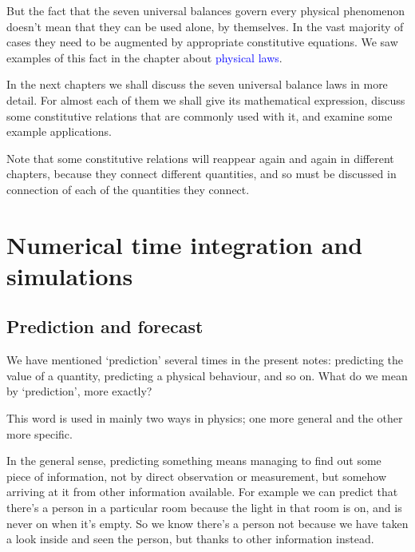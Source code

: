 \documentclass[a4paper,12pt,%
onecolumn,oneside,titlepage,%
british%
]{memoir}
\renewcommand*{\|}[1][]{\nonscript\:#1\vert\nonscript\:\mathopen{}}
\newcommand*{\sect}{\S}%
\renewcommand*{\autoref}[2]{\sidepar{\vspace{-1ex}\footnotesize{\color{blue}\faIcon{%
reply%
}\enspace\sect\,\ref{#1} page\,\pageref{#1}}}\textcolor{blue}{#2}}
\begin{document}
\smallskip


But the fact that the seven universal balances govern every physical phenomenon doesn't mean that they can be used alone, by themselves. In the vast majority of cases they need to be augmented by appropriate constitutive equations. We saw examples of this fact in the chapter about \autoref{cha:laws}{physical laws}.


\bigskip

In the next chapters we shall discuss the seven universal balance laws in more detail. For almost each of them we shall give its mathematical expression, discuss some constitutive relations that are commonly used with it, and examine some example applications.

Note that some constitutive relations will reappear again and again in different chapters, because they connect different quantities, and so must be discussed in connection of each of the quantities they connect.



\section{Numerical time integration and simulations}
\label{sec:numeric_simulation}


\subsection{Prediction and forecast}
\label{sec:forecast}

We have mentioned \enquote*{prediction} several times in the present notes: predicting the value of a quantity, predicting a physical behaviour, and so on. What do we mean by \enquote*{prediction}, more exactly?

This word is used in mainly two ways in physics; one more general and the other more specific.

In the general sense, predicting something means managing to find out some piece of information, not by direct observation or measurement, but somehow arriving at it from other information available. For example we can predict that there's a person in a particular room because the light in that room is on, and is never on when it's empty. So we know there's a person not because we have taken a look inside and seen the person, but thanks to other information instead.
\end{document}
